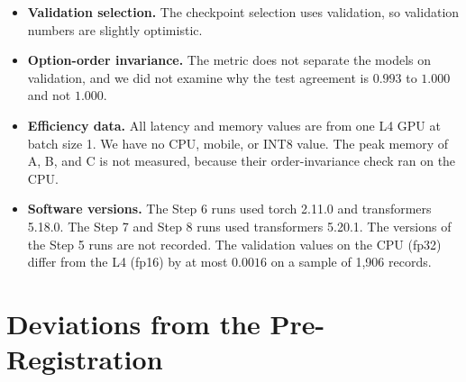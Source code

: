 \documentclass[11pt,a4paper]{article}
\begin{document}
\begin{itemize}
  \item \textbf{Validation selection.} The checkpoint selection uses validation, so validation numbers are slightly optimistic.
  \item \textbf{Option-order invariance.} The metric does not separate the models on validation, and we did not examine why the test agreement is $0.993$ to $1.000$ and not $1.000$.
  \item \textbf{Efficiency data.} All latency and memory values are from one L4 GPU at batch size 1. We have no CPU, mobile, or INT8 value. The peak memory of A, B, and C is not measured, because their order-invariance check ran on the CPU.
  \item \textbf{Software versions.} The Step 6 runs used torch 2.11.0 and transformers 5.18.0. The Step 7 and Step 8 runs used transformers 5.20.1. The versions of the Step 5 runs are not recorded. The validation values on the CPU (fp32) differ from the L4 (fp16) by at most $0.0016$ on a sample of 1{,}906 records.
\end{itemize}

\section{Deviations from the Pre-Registration}\label{sec:deviations}
\end{document}
